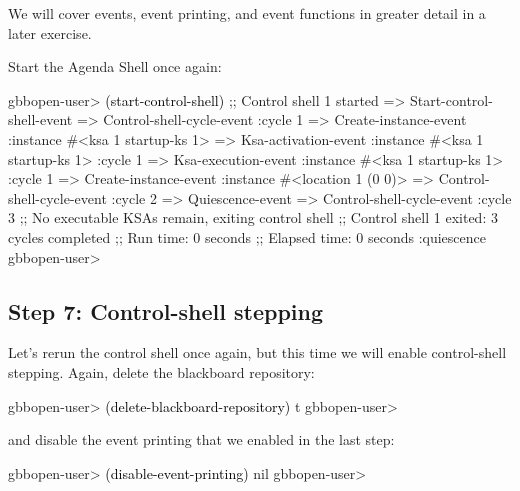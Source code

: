 \documentclass[10pt,twoside,english,pdftex]{article}
\begin{document}
We will cover events, event printing, and event functions in greater
detail in a later exercise.

%
%
Start the Agenda Shell once again:
%
\W\supp
\begin{example}
\textcolor{darkergray}{%
  gbbopen-user> \textcolor{black}{(start-control-shell)}
  ;; Control shell 1 started
  => Start-control-shell-event
  => Control-shell-cycle-event
       :cycle 1
  => Create-instance-event
       :instance #<ksa 1 startup-ks 1>
  => Ksa-activation-event
       :instance #<ksa 1 startup-ks 1>
       :cycle 1
  => Ksa-execution-event
       :instance #<ksa 1 startup-ks 1>
       :cycle 1
  => Create-instance-event
       :instance #<location 1 (0 0)>
  => Control-shell-cycle-event
       :cycle 2
  => Quiescence-event
  => Control-shell-cycle-event
       :cycle 3
  ;; No executable KSAs remain, exiting control shell
  ;; Control shell 1 exited: 3 cycles completed
  ;; Run time: 0 seconds
  ;; Elapsed time: 0 seconds
  :quiescence
  gbbopen-user>}
\end{example}

\subsection*{Step 7: Control-shell stepping}

%
%
Let's rerun the control shell once again, but this time we will enable
control-shell stepping. Again, delete the blackboard repository:
%
\W\supp
\begin{example}
\textcolor{darkergray}{%
  gbbopen-user> \textcolor{black}{(delete-blackboard-repository)}
  t
  gbbopen-user>}
\end{example}
%
and disable the event printing that we enabled in the last step:
%
\W\supp\notpretop
\begin{example}
\textcolor{darkergray}{%
  gbbopen-user> \textcolor{black}{(disable-event-printing)}
  nil
  gbbopen-user>}
\end{example}
\end{document}
